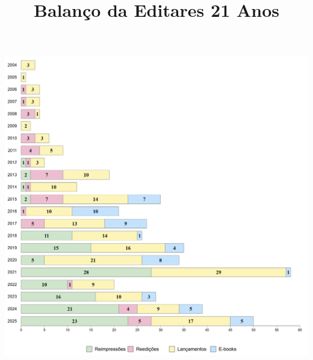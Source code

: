 \documentclass{gescons}
\title{Balanço da Editares 21 Anos}
\begin{document}
    \makeentrevistatitle


    
    
\begin{center}
    
    \includegraphics[width=\textwidth]{articles/balanco/grafico/grafico.png}  
\end{center}
    


\end{document}
